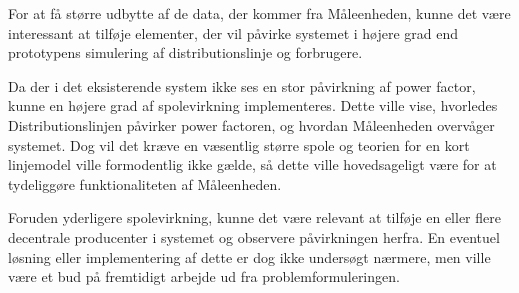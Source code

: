 
For at få større udbytte af de data, der kommer fra Måleenheden, kunne det være interessant at tilføje elementer, der vil påvirke systemet i højere grad end prototypens simulering af distributionslinje og forbrugere. 

Da der i det eksisterende system ikke ses en stor påvirkning af power factor, kunne en højere grad af spolevirkning implementeres. Dette ville vise, hvorledes Distributionslinjen påvirker power factoren, og hvordan Måleenheden overvåger systemet. Dog vil det kræve en væsentlig større spole og teorien for en kort linjemodel ville formodentlig ikke gælde, så dette ville hovedsageligt være for at tydeliggøre funktionaliteten af Måleenheden. 

Foruden yderligere spolevirkning, kunne det være relevant at tilføje en eller flere decentrale producenter i systemet og observere påvirkningen herfra. En eventuel løsning eller implementering af dette er dog ikke undersøgt nærmere, men ville være et bud på fremtidigt arbejde ud fra problemformuleringen. 
